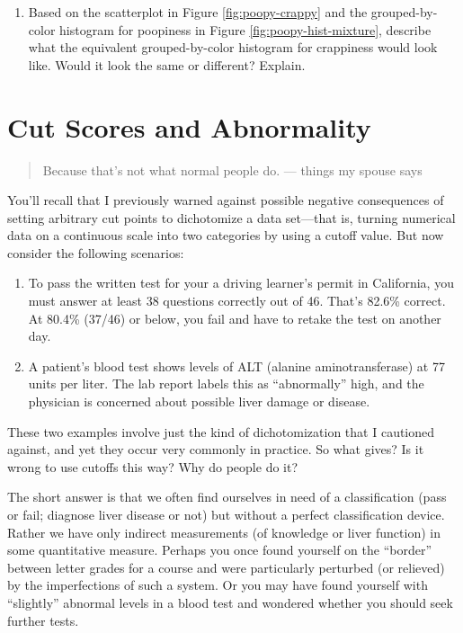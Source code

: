 \documentclass[openany]{book}
\providecommand{\tightlist}{%
  \setlength{\itemsep}{0pt}\setlength{\parskip}{0pt}}
\begin{document}
\begin{enumerate}
\def\labelenumi{\arabic{enumi})}
\tightlist
\item
  Based on the scatterplot in Figure \ref{fig:poopy-crappy} and the grouped-by-color histogram for poopiness in Figure \ref{fig:poopy-hist-mixture}, describe what the equivalent grouped-by-color histogram for crappiness would look like. Would it look the same or different? Explain.
\end{enumerate}

\hypertarget{cut-scores-and-abnormality}{%
\chapter{Cut Scores and Abnormality}\label{cut-scores-and-abnormality}}

\begin{quote}
Because that's not what normal people do.
--- things my spouse says
\end{quote}

You'll recall that I previously warned against possible negative consequences of setting arbitrary cut points to dichotomize a data set---that is, turning numerical data on a continuous scale into two categories by using a cutoff value. But now consider the following scenarios:

\begin{enumerate}
\def\labelenumi{\arabic{enumi})}
\item
  To pass the written test for your a driving learner's permit in California, you must answer at least 38 questions correctly out of 46. That's 82.6\% correct. At 80.4\% (37/46) or below, you fail and have to retake the test on another day.
\item
  A patient's blood test shows levels of ALT (alanine aminotransferase) at 77 units per liter. The lab report labels this as ``abnormally'' high, and the physician is concerned about possible liver damage or disease.
\end{enumerate}

These two examples involve just the kind of dichotomization that I cautioned against, and yet they occur very commonly in practice. So what gives? Is it wrong to use cutoffs this way? Why do people do it?

The short answer is that we often find ourselves in need of a classification (pass or fail; diagnose liver disease or not) but without a perfect classification device. Rather we have only indirect measurements (of knowledge or liver function) in some quantitative measure. Perhaps you once found yourself on the ``border'' between letter grades for a course and were particularly perturbed (or relieved) by the imperfections of such a system. Or you may have found yourself with ``slightly'' abnormal levels in a blood test and wondered whether you should seek further tests.
\end{document}
